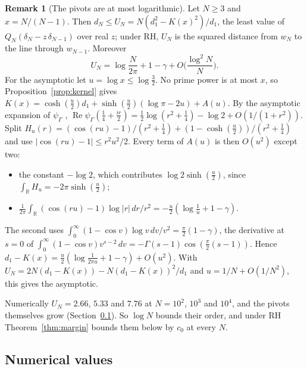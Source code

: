 \documentclass[11pt]{article}
\theoremstyle{definition}
\newtheorem*{remark}{Remark}
\newcommand{\KH}{K}
\begin{document}
\begin{remark}[The pivots are at most logarithmic]
Let $N \ge 3$ and $x = N/(N - 1)$. Then $d_N \le U_N = N(d_1^2 - \KH(x)^2)/d_1$, the least value of $Q_N(\delta_N -
z\,\delta_{N - 1})$ over real $z$; under RH, $U_N$ is the squared distance from $w_N$ to the line through $w_{N - 1}$.
Moreover
\[
U_N = \log\frac{N}{2\pi} + 1 - \gamma + O\Big(\frac{\log^2 N}{N}\Big).
\]
For the asymptotic let $u = \log x \le \log\frac32$. No prime
power is at most $x$, so Proposition~\ref{prop:kernel} gives
$\KH(x) = \cosh(\frac u2) d_1 + \sinh(\frac u2)(\log\pi - 2u) + A(u)$. By the asymptotic expansion of $\psi_\Gamma$
\cite[(5.11.2)]{dlmf},
$\operatorname{Re}
\psi_\Gamma(\frac14 + \frac{ir}2) = \frac12 \log(r^2 + \frac14) - \log 2 + O(1/(1 + r^2))$. Split $H_u(r) = (\cos(ru) -
1)/(r^2 + \frac14) + (1 - \cosh(\frac u2))/(r^2 + \frac14)$ and use $|\cos(ru) - 1| \le r^2u^2/2$. Every term of $A(u)$
is then $O(u^2)$ except two:
\begin{itemize}
\item the constant $-\log 2$, which contributes $\log 2 \sinh(\frac u2)$, since $\int_{\mathbb R} H_u = -2\pi
\sinh(\frac u2)$;
\item $\frac{1}{2\pi} \int_{\mathbb R} (\cos(ru) - 1)\log|r|\,dr/r^2 = -\frac u2(\log\frac1u + 1 - \gamma)$.
\end{itemize}
The second uses $\int_0^\infty (1 - \cos v)\log v\,dv/v^2 = \frac\pi2(1 - \gamma)$, the derivative at $s = 0$ of
$\int_0^\infty (1 - \cos v)v^{s - 2}\,dv = -\Gamma(s - 1)\cos(\frac\pi2(s - 1))$. Hence $d_1 - \KH(x) = \frac u2(\log
\frac{1}{2\pi u} + 1 - \gamma) + O(u^2)$. With $U_N = 2N(d_1 - \KH(x)) - N(d_1 - \KH(x))^2/d_1$ and $u = 1/N +
O(1/N^2)$, this gives the asymptotic.

Numerically $U_N = 2.66$, $5.33$ and $7.76$ at $N = 10^2$, $10^3$ and $10^4$, and the pivots themselves grow
(Section~\ref{sec:numerics}). So $\log N$ bounds their order, and under RH Theorem~\ref{thm:margin} bounds them below
by $c_0$ at every $N$.
\end{remark}

\subsection{Numerical values}\label{sec:numerics}
\end{document}
